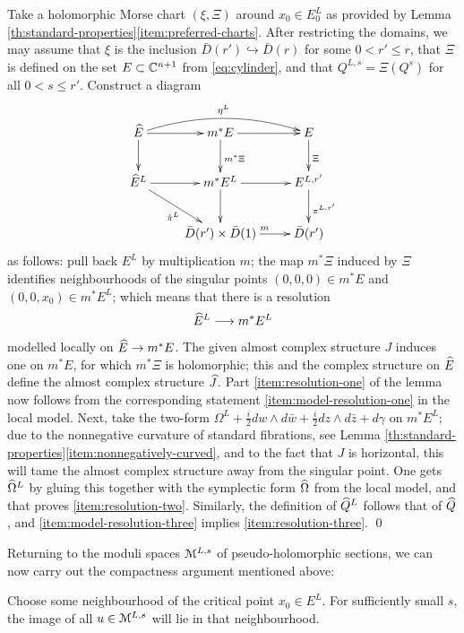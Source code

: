 \documentclass[10pt,letterpaper]{article}
\begin{document}
 Take a holomorphic Morse chart
$(\xi,\Xi)$ around $x_0 \in E_0^L$ as provided by Lemma
\ref{th:standard-properties}\ref{item:preferred-charts}. After restricting the
domains, we may assume that $\xi$ is the inclusion $\bar{D}(r') \hookrightarrow
\bar{D}(r)$ for some $0<r' \leq r$, that $\Xi$ is defined on the set $E \subset
\mathbb{C}^{n+1}$ from \eqref{eq:cylinder}, and that $Q^{L,s} = \Xi(Q^s)$ for all $0 <
s \leq r'$. Construct a diagram
\[
\xymatrix{
 {\hatE} \ar[d] \ar[r] \ar@/^1pc/[rr]^{\eta^L} &
 {m^*E} \ar[d]^{m^*\Xi} \ar[r] & {E} \ar[d]^{\Xi} \\
 {\hatE^L} \ar[dr]_{\hat\pi^L} \ar[r] &
 {m^*E^L} \ar[r] \ar[d] &
 {E^{L,r'}} \ar[d]^{\pi^{L,r'}} \\
 & {\bar{D}(r') \times \bar{D}(1)} \ar[r]^{m} &
 {\bar{D}(r')}
 }
\]
as follows: pull back $E^L$ by multiplication $m$; the map $m^*\Xi$ induced by
$\Xi$ identifies neighbourhoods of the singular points $(0,0,0) \in m^*E$ and
$(0,0,x_0) \in m^*E^L$; which means that there is a resolution \[\widehat{E}^L
\longrightarrow m^*E^L\] modelled locally on $\widehat{E} \rightarrow m^*E$. The
given almost complex structure $J$ induces one on $m^*E$, for which $m^*\Xi$ is
holomorphic; this and the complex structure on $\widehat{E}$ define the almost
complex structure $\widehat{J}$. Part \ref{item:resolution-one} of the lemma now
follows from the corresponding statement \ref{item:model-resolution-one} in the
local model. Next, take the two-form $\Omega^L + \frac{i}{2} dw \wedge d\bar{w}
+ \frac{i}{2} dz \wedge d\bar{z} + d\gamma$ on $m^*E^L$; due to the nonnegative
curvature of standard fibrations, see Lemma
\ref{th:standard-properties}\ref{item:nonnegatively-curved}, and to the fact
that $J$ is horizontal, this will tame the almost complex structure away from
the singular point. One gets $\widehat{\Omega}^L$ by gluing this together with the
symplectic form $\widehat{\Omega}$ from the local model, and that proves
\ref{item:resolution-two}. Similarly, the definition of $\widehat{Q}^L$ follows that
of $\widehat{Q}$, and \ref{item:model-resolution-three} implies
\ref{item:resolution-three}. \qed

Returning to the moduli spaces $\mathcal{M}^{L,s}$ of pseudo-holomorphic sections, we
can now carry out the compactness argument mentioned above:

\begin{lemma} \label{th:degeneration}
Choose some neighbourhood of the critical point $x_0 \in E^L$. For sufficiently
small $s$, the image of all $u \in \mathcal{M}^{L,s}$ will lie in that neighbourhood.
\end{lemma}
\end{document}
